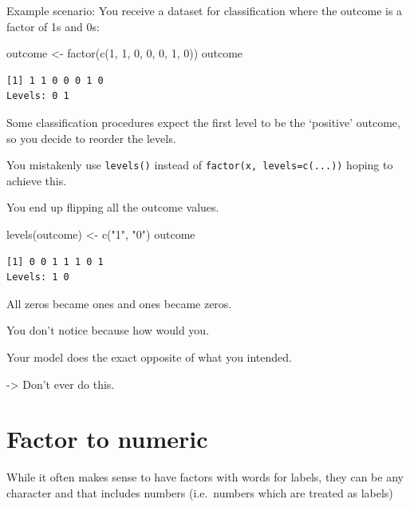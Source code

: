 \documentclass[
]{book}
\newenvironment{Shaded}{\begin{snugshade}}{\end{snugshade}}
\newcommand{\DecValTok}[1]{\textcolor[rgb]{0.00,0.00,0.81}{#1}}
\newcommand{\FunctionTok}[1]{\textcolor[rgb]{0.00,0.00,0.00}{#1}}
\newcommand{\NormalTok}[1]{#1}
\newcommand{\OtherTok}[1]{\textcolor[rgb]{0.56,0.35,0.01}{#1}}
\newcommand{\StringTok}[1]{\textcolor[rgb]{0.31,0.60,0.02}{#1}}
\begin{document}
Example scenario: You receive a dataset for classification where the outcome is a factor of 1s and 0s:

\begin{Shaded}
\begin{Highlighting}[]
\NormalTok{outcome }\OtherTok{\textless{}{-}} \FunctionTok{factor}\NormalTok{(}\FunctionTok{c}\NormalTok{(}\DecValTok{1}\NormalTok{, }\DecValTok{1}\NormalTok{, }\DecValTok{0}\NormalTok{, }\DecValTok{0}\NormalTok{, }\DecValTok{0}\NormalTok{, }\DecValTok{1}\NormalTok{, }\DecValTok{0}\NormalTok{))}
\NormalTok{outcome}
\end{Highlighting}
\end{Shaded}

\begin{verbatim}
[1] 1 1 0 0 0 1 0
Levels: 0 1
\end{verbatim}

Some classification procedures expect the first level to be the `positive' outcome, so you decide to reorder the levels.

You mistakenly use \texttt{levels()} instead of \texttt{factor(x,\ levels=c(...))} hoping to achieve this.

You end up flipping all the outcome values.

\begin{Shaded}
\begin{Highlighting}[]
\FunctionTok{levels}\NormalTok{(outcome) }\OtherTok{\textless{}{-}} \FunctionTok{c}\NormalTok{(}\StringTok{"1"}\NormalTok{, }\StringTok{"0"}\NormalTok{)}
\NormalTok{outcome}
\end{Highlighting}
\end{Shaded}

\begin{verbatim}
[1] 0 0 1 1 1 0 1
Levels: 1 0
\end{verbatim}

All zeros became ones and ones became zeros.

You don't notice because how would you.

Your model does the exact opposite of what you intended.

-\textgreater{} Don't ever do this.

\hypertarget{factor-to-numeric}{%
\section{Factor to numeric}\label{factor-to-numeric}}

While it often makes sense to have factors with words for labels, they can be any character and that includes numbers (i.e.~numbers which are treated as labels)
\end{document}
